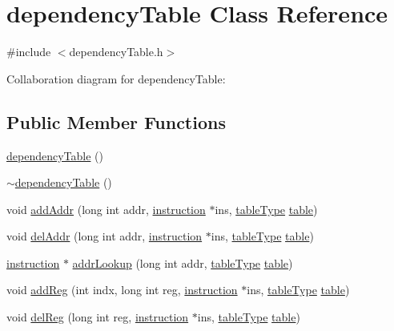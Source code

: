 \hypertarget{classdependencyTable}{
\section{dependencyTable Class Reference}
\label{classdependencyTable}
}


{\ttfamily \#include $<$dependencyTable.h$>$}



Collaboration diagram for dependencyTable:
\subsection*{Public Member Functions}
\begin{DoxyCompactItemize}
\item 
\hyperlink{classdependencyTable_abae7a5ee69f34dfca3d0b1195b773225}{dependencyTable} ()
\item 
\hyperlink{classdependencyTable_a0b227c520264190bae8782e4f9db593a}{$\sim$dependencyTable} ()
\item 
void \hyperlink{classdependencyTable_a2152aa2490daef06772595e126e6e024}{addAddr} (long int addr, \hyperlink{classinstruction}{instruction} $\ast$ins, \hyperlink{dependencyTable_8h_ab390e08ed69004340ece1f911f48fd1b}{tableType} \hyperlink{classtable}{table})
\item 
void \hyperlink{classdependencyTable_abffec553d72068c891beb9fa8fe73440}{delAddr} (long int addr, \hyperlink{classinstruction}{instruction} $\ast$ins, \hyperlink{dependencyTable_8h_ab390e08ed69004340ece1f911f48fd1b}{tableType} \hyperlink{classtable}{table})
\item 
\hyperlink{classinstruction}{instruction} $\ast$ \hyperlink{classdependencyTable_ad5215d3493ae1b82e37e673b33fd6892}{addrLookup} (long int addr, \hyperlink{dependencyTable_8h_ab390e08ed69004340ece1f911f48fd1b}{tableType} \hyperlink{classtable}{table})
\item 
void \hyperlink{classdependencyTable_a09e8df2809062b427a8ff3494ecb853d}{addReg} (int indx, long int reg, \hyperlink{classinstruction}{instruction} $\ast$ins, \hyperlink{dependencyTable_8h_ab390e08ed69004340ece1f911f48fd1b}{tableType} \hyperlink{classtable}{table})
\item 
void \hyperlink{classdependencyTable_a6057fc845371e5846048e7c7ede21cd8}{delReg} (long int reg, \hyperlink{classinstruction}{instruction} $\ast$ins, \hyperlink{dependencyTable_8h_ab390e08ed69004340ece1f911f48fd1b}{tableType} \hyperlink{classtable}{table})
\item 

\end{DoxyCompactItemize}
